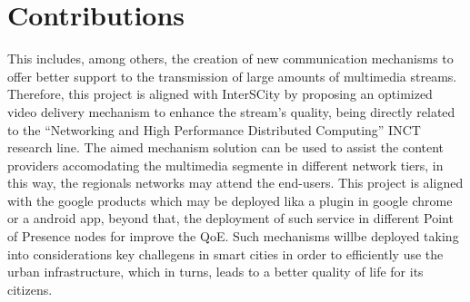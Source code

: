 \section{Contributions}
\label{sec:contributions}



This includes, among others, the creation of new communication mechanisms to offer better support to the transmission of large amounts of multimedia streams. Therefore, this project is aligned with InterSCity by proposing an optimized video delivery mechanism to enhance the stream’s quality, being directly related to the “Networking and High Performance Distributed Computing” INCT research line.
The aimed mechanism solution can be used to assist the content providers accomodating the multimedia segmente in different network tiers, in this way, the regionals networks may attend the end-users. This project is aligned with the google products which may be deployed lika a plugin in google chrome or a android app, beyond that, the deployment of such service in different Point of Presence nodes for improve the QoE. Such mechanisms willbe deployed taking into considerations key challegens in smart cities in order to efficiently use the urban infrastructure, which in turns, leads to a better quality of life for its citizens. 




